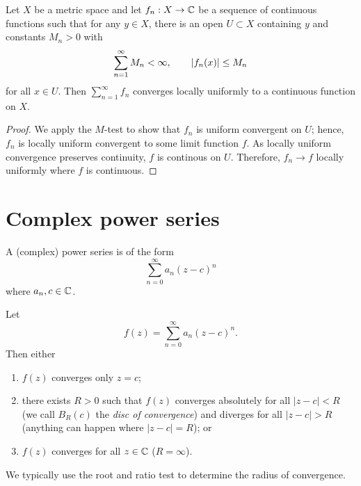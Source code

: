 
\begin{theorem}
    Let $X$ be a metric space and let $f_n: X \to \mathbb{C}$ be a sequence of continuous functions such that for any $y \in X$, there is an open $U \subset X$ containing $y$ and constants $M_n > 0$ with
    \[ \sum_{n = 1}^\infty M_n < \infty, \qquad \left\lvert f_n(x)\right\rvert \leq M_n \]
    for all $x \in U$. Then $\sum_{n = 1}^\infty f_n$ converges locally uniformly to a continuous function on $X$.
\end{theorem}

\begin{proof}
    We apply the $M$-test to show that $f_n$ is uniform convergent on $U$; 
    hence, $f_n$ is locally uniform convergent to some limit function $f$. 
    As locally uniform convergence preserves continuity, $f$ is continous on $U$.
    Therefore, $f_n \to f$ locally uniformly where $f$ is continuous. 
\end{proof}

\section{Complex power series}

\begin{definition}
    A (complex) power series is of the form
    \[ \sum_{n = 0}^\infty a_n (z - c)^n \]
    where $a_n, c \in \mathbb{C}$.
\end{definition}

\begin{theorem}
    Let 
    \[ f(z) = \sum_{n = 0}^\infty a_n (z - c)^n. \] 
    Then either
    \begin{enumerate}
        \item $f(z)$ converges only $z = c$; 
        \item there exists $R > 0$ such that $f(z)$ converges absolutely for all $\lvert z - c \rvert < R$ (we call $B_R(c)$ the \emph{disc of convergence}) and diverges for all $\lvert z - c \rvert > R$ (anything can happen where $\lvert z - c \rvert = R$); or
        \item $f(z)$ converges for all $z \in \mathbb{C}$ ($R = \infty$).
    \end{enumerate}
\end{theorem}

\begin{remark}
    We typically use the root and ratio test to determine the radius of convergence.
\end{remark}


